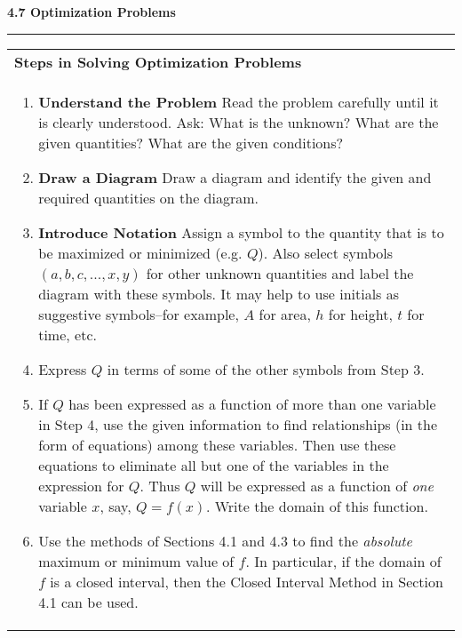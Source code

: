 \documentclass{article}
\begin{document}
\begin{center}
\Large\textbf{4.7 Optimization Problems}

\noindent\hfill\rule{0.3\textwidth}{.4pt}\hfill
\vspace{24pt}

\large
\def\arraystretch{1.3}
{\setlength{\tabcolsep}{16pt}
\begin{tabularx}{.9\textwidth}{|X|}
\hline
	\vspace{1pt}
	\Large \textbf{Steps in Solving Optimization Problems} \\
	\begin{enumerate}
	\item \textbf{Understand the Problem} \: Read the problem carefully until it is clearly understood. Ask: What is the unknown? What are the given quantities? What are the given conditions? \vspace{5pt}
	\item \textbf{Draw a Diagram} \: Draw a diagram and identify the given and required quantities on the diagram. \vspace{5pt}
	\item \textbf{Introduce Notation} \: Assign a symbol to the quantity that is to be maximized or minimized (e.g. $Q$). Also select symbols $(a, b, c, ..., x, y)$ for other unknown quantities and label the diagram with these symbols. It may help to use initials as suggestive symbols--for example, $A$ for area, $h$ for height, $t$ for time, etc. \vspace{5pt}
	\item Express $Q$ in terms of some of the other symbols from Step 3. \vspace{5pt}
	\item If $Q$ has been expressed as a function of more than one variable in Step 4, use the given information to find relationships (in the form of equations) among these variables. Then use these equations to eliminate all but one of the variables in the expression for $Q$. Thus $Q$ will be expressed as a function of \textit{one} variable $x$, say, $Q = f(x)$. Write the domain of this function. \vspace{5pt}
	\item Use the methods of Sections 4.1 and 4.3 to find the \textit{absolute} maximum or minimum value of $f$. In particular, if the domain of $f$ is a closed interval, then the Closed Interval Method in Section 4.1 can be used.
	\end{enumerate}\\
	

\end{tabularx}}
\end{center}
\end{document}
